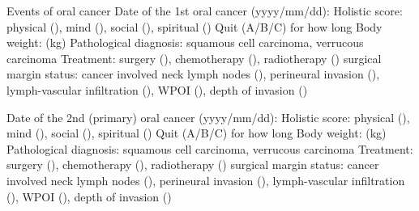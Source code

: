 \documentclass{article}
\begin{document}
\begin{outline}
\0 Events of oral cancer
\1 Date of the 1st oral cancer (yyyy/mm/dd):
    \2 Holistic score: physical (), mind (), social (), spiritual ()
    \2 Quit (A/B/C) for how long
    \2 Body weight: (kg)
    \2 Pathological diagnosis: squamous cell carcinoma, verrucous carcinoma 
    \2 Treatment: surgery (), chemotherapy (), radiotherapy ()
    \2 surgical margin status:
    \2 cancer involved neck lymph nodes (), perineural invasion (), lymph-vascular infiltration (), WPOI (), depth of invasion ()

\1 Date of the 2nd (primary) oral cancer (yyyy/mm/dd):
    \2 Holistic score: physical (), mind (), social (), spiritual ()
    \2 Quit (A/B/C) for how long
    \2 Body weight: (kg)
    \2 Pathological diagnosis: squamous cell carcinoma, verrucous carcinoma 
    \2 Treatment: surgery (), chemotherapy (), radiotherapy ()
    \2 surgical margin status:
    \2 cancer involved neck lymph nodes (), perineural invasion (), lymph-vascular infiltration (), WPOI (), depth of invasion ()
\end{outline}

                        
\end{document}
